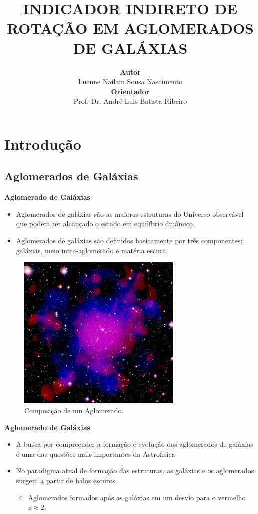 \documentclass[xcolor=dvipsnames,10pt]{beamer}
\title{\textsc{INDICADOR INDIRETO DE ROTAÇÃO EM AGLOMERADOS DE GALÁXIAS}}
\author{
  \textbf{Autor} \\
  Luenne Nailam Sousa Nascimento \\
  \textbf{Orientador} \\
  Prof. Dr. André Luis Batista Ribeiro
}
\begin{document}
\frame{\titlepage}
\frame{\tableofcontents}
\section{Introdução}

\subsection{Aglomerados de Galáxias}

\begin{frame}{\textbf{Aglomerado de Galáxias}}
\begin{itemize}
\item Aglomerados de galáxias são as maiores estruturas do Universo observável que podem ter alcançado o estado em equilíbrio dinâmico.
\item Aglomerados de galáxias são definidos basicamente por três componentes: galáxias, meio intra-aglomerado e matéria escura.
\end{itemize}
 \begin{figure}[!htbp] %
    \begin{center}
    \includegraphics[height=0.5\textheight,width=0.7\textwidth]{resultados/cluster.jpg}%
    \caption{\scriptsize{Composição de um Aglomerado.}}
    \end{center}
  \end{figure} 
\end{frame}

\begin{frame}{\textbf{Aglomerado de Galáxias}}
\begin{itemize}
	\item A busca por compreender a formação e evolução dos aglomerados de galáxias é uma das questões mais importantes da Astrofísica. 
	\item  No paradigma atual de formação das estruturas, as galáxias e os aglomerados surgem a partir de halos escuros.
	\begin{itemize}
	\item Aglomerados formados após as galáxias em um desvio para o vermelho $z \approx 2$.
	\end{itemize}
\end{itemize}
\end{frame}
\end{document}
